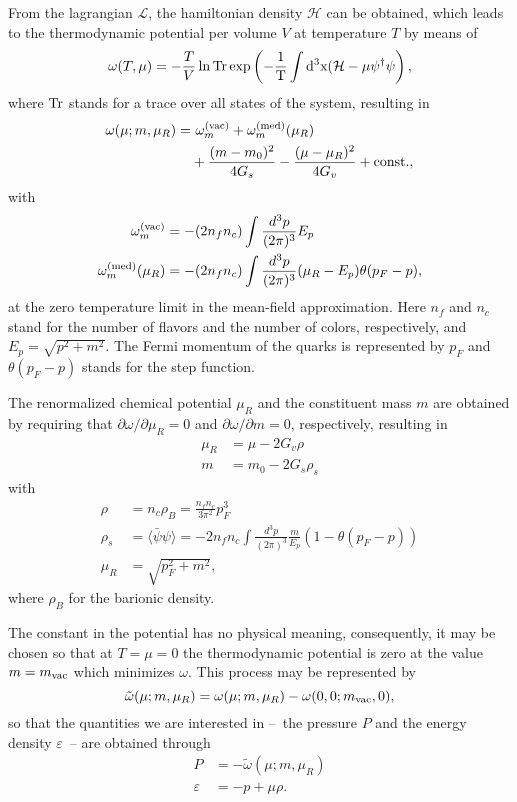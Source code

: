 \documentclass[prc, reprint, amsmath, floatfix, linenumbers,10pt]{revtex4-1}
\newcommand{\tr}{\rm{Tr}}
\begin{document}
From the lagrangian $\mathcal{L}$, the hamiltonian density $\mathcal{H}$ can be obtained, which leads to the thermodynamic potential per volume $V$ at temperature $T$ by means of
\begin{equation}
	\omega(T, \mu) = -\frac{T}{V} \ln \tr \exp\left(-\frac{1}{T}\int d^3x(\mathcal{H} - \mu\psi^\dagger\psi\right),
\end{equation}
%
where $\tr$ stands for a trace over all states of the system, resulting in \cite{Buballa1996}
\begin{equation}\label{Eq:Pot_Termo_Temp_zero}
\begin{split}
	\omega(\mu; m, \mu_R) =&~ \omega_m^{(\rm{vac})} + \omega_m^{(\rm{med})}(\mu_R) \\
	&+ \frac{(m - m_0)^2}{4G_s} - \frac{(\mu - \mu_R)^2}{4G_v} +  \textrm{const.},
\end{split}
\end{equation}
%
with
\begin{align}
	\omega_m^{(\rm{vac})} &= -(2 n_f n_c) \int \frac{d^3p}{(2\pi)^3} E_p\\
	\omega_m^{(\rm{med})}(\mu_R) &= - (2n_f n_c) \int\frac{d^3p}{(2 \pi)^3} (\mu_R - E_p) \theta(p_F -p),
\end{align}
%
at the zero temperature limit in the mean-field approximation. Here $n_f$ and $n_c$ stand for the number of flavors and the number of colors, respectively, and $E_p = \sqrt{p^2 + m^2}$. The Fermi momentum of the quarks is represented by $p_F$ and $\theta(p_F - p)$ stands for the step function.

The renormalized chemical potential $\mu_R$ and the constituent mass $m$ are obtained by requiring that $\partial \omega / \partial \mu_R = 0$ and $\partial \omega / \partial m = 0$, respectively, resulting in
\begin{align}
	\mu_R &= \mu - 2 G_v \rho \\
	m &= m_0 - 2 G_s \rho_s
\end{align}
%
with
\begin{align}
	\rho &= n_c \rho_B = \frac{n_f n_c}{3\pi^2} p_F^3 \\
	\rho_s &= \langle \bar\psi\psi\rangle = - 2 n_f n_c \int\frac{d^3p}{(2\pi)^3} \frac{m}{E_p}(1 - \theta(p_F - p)) \\
	\mu_R &= \sqrt{p_F^2 + m^2},
\end{align}
%
where $\rho_B$ for the barionic density.

The constant in the potential has no physical meaning, consequently, it may be chosen so that at $T = \mu = 0$ the thermodynamic potential is zero at the value $m = m_{\rm{vac}}$ which minimizes $\omega$. This process may be represented by 
\begin{equation}
	\tilde\omega(\mu; m, \mu_R) = \omega(\mu; m, \mu_R) - \omega(0, 0; m_{\rm{vac}}, 0),
\end{equation}
%
so that the quantities we are interested in --~the pressure $P$ and the energy density $\varepsilon$~-- are obtained through
\begin{align}
		P &= -\tilde\omega(\mu; m, \mu_R) \label{Exp_pressao_T}\\
		\varepsilon &= -p + \mu \rho. \label{Exp_energia_T}
\end{align}
	
\end{document}
